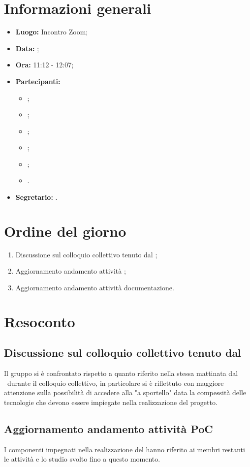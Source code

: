 \section{Informazioni generali}
\begin{itemize}
	\item \textbf{Luogo:} Incontro Zoom;
	\item \textbf{Data:} \Data;
	\item \textbf{Ora:} 11:12 - 12:07;
	\item \textbf{Partecipanti:}
	\begin{itemize}
		\item \BL{}; 
		\item \FF{};
		\item \MM{}; 
		\item \PC{};
		\item \TG{};
		\item \TL{}.
	\end{itemize} 
	\item \textbf{Segretario:} \TG{}.
\end{itemize}

\section{Ordine del giorno}
\begin{enumerate}
	\item Discussione sul colloquio collettivo tenuto dal \VT;
	\item Aggiornamento andamento attività ;
	\item Aggiornamento andamento attività documentazione.
\end{enumerate}

\section{Resoconto}
\subsection{Discussione sul colloquio collettivo tenuto dal \VT}
Il gruppo si è confrontato rispetto a quanto riferito nella stessa mattinata dal \VT\ durante il colloquio collettivo, in particolare si è riflettuto con maggiore attenzione sulla possibilità di accedere alla  "a sportello" data la compessità delle tecnologie che devono essere impiegate nella realizzazione del progetto.
\subsection{Aggiornamento andamento attività PoC}
I componenti impegnati nella realizzazione del  hanno riferito ai membri restanti le attività e lo studio svolto fino a questo momento.
